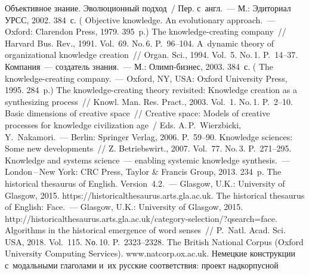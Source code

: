 \begin{multicols}{2}
{\small\frenchspacing
 {%
 \begin{thebibliography}{99}
 Объективное знание. Эволюционный подход~/ Пер. 
с~англ.~--- М.: Эдиториал УРСС, 2002. 384~с. ( Objective 
knowledge. An evolutionary approach.~--- Oxford: Clarendon Press, 1979. 395~p.)
 The knowledge-creating company~// Harvard Bus. Rev., 
1991. Vol.~69. No.\,6. P.~96--104.
 A~dynamic theory of organizational knowledge creation~// 
Organ. Sci., 1994. Vol.~5. No.\,1. P.~14--37.
 Компания~--- создатель знания.~--- М.:  
Олимп-биз\-нес, 2003. 384~с. ( The  
knowledge-creating company.~--- Oxford, NY, USA: Oxford University Press, 1995. 
284~p.)
 The knowledge-creating theory revisited: Knowledge 
creation as a synthesizing process~// Knowl. Man. Res. Pract., 
2003. Vol.~1. No.\,1. P.~2--10.
 Basic dimensions of creative space~// Creative 
space: Models of creative processes for knowledge civilization age~/ Eds. 
A.\,P.~Wierzbicki, Y.~Nakamori.~--- Berlin: Springer Verlag, 2006. P.~59--90.
 Knowledge sciences: Some new 
developments~// Z. Betriebswirt., 2007. Vol.~77. No.\,3.  
P.~271--295.
 Knowledge and systems science~--- enabling systemic knowledge 
synthesis.~--- London\,--\,New York: CRC Press, Taylor \& Francis Group, 2013. 
234~p.
 The historical 
thesaurus of English. Version~4.2.~--- Glasgow, U.K.: University of Glasgow, 2015. {\sf 
https://historicalthesaurus.arts.gla.ac.uk}.
 The historical 
thesaurus of English: Face.~--- Glasgow, U.K.: University of Glasgow, 2015.\linebreak
{\sf http://historicalthesaurus.arts.gla.ac.uk/category-selection/?qsearch=face}.
 Algorithms in the historical 
emergence of word senses~// P.~Natl. Acad. Sci. USA, 
2018. Vol.~115. Nо.\,10. P.~2323--2328.
The British National Corpus (Oxford University Computing Services). {\sf 
www.natcorp.ox.ac.uk}.
 Немецкие конструкции 
с~модальными глаголами и~их русские соответствия: проект надкорпусной 

\end{thebibliography}}}
\end{multicols}
